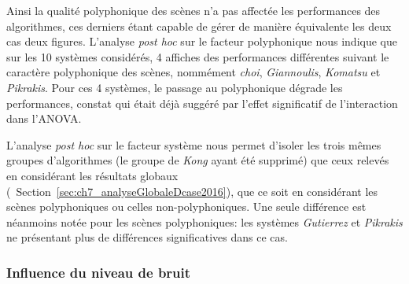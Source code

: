 Ainsi la qualité polyphonique des scènes n'a pas affectée les performances des algorithmes, ces derniers étant capable de gérer de manière équivalente les deux cas deux figures. L'analyse \emph{post hoc} sur le facteur polyphonique nous indique que sur les 10 systèmes considérés, 4 affiches des performances différentes suivant le caractère polyphonique des scènes, nommément  \emph{choi}, \emph{Giannoulis}, \emph{Komatsu} et \emph{Pikrakis}. Pour ces 4 systèmes, le passage au polyphonique dégrade les performances, constat qui était déjà suggéré par l'effet significatif de l'interaction dans l'ANOVA.

L'analyse \emph{post hoc} sur le facteur système nous permet d'isoler les trois mêmes groupes d'algorithmes (le groupe de \emph{Kong} ayant été supprimé) que ceux relevés en considérant les résultats globaux (\cf~Section~\ref{sec:ch7_analyseGlobaleDcase2016}), que ce soit en considérant les scènes polyphoniques ou celles non-polyphoniques. Une seule différence est néanmoins notée pour les scènes polyphoniques: les systèmes \emph{Gutierrez} et \emph{Pikrakis} ne présentant plus de différences significatives dans ce cas.

\subsubsection{Influence du niveau de bruit}

